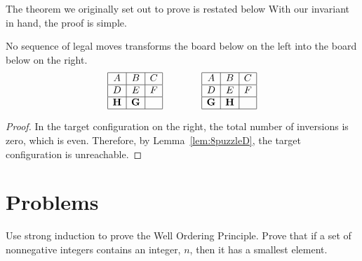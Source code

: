 The theorem we originally set out to prove is restated below  With our
invariant in hand, the proof is simple.
\begin{theorem*}
No sequence of legal moves transforms the board below on the left into
the board below on the right.
\begin{equation*}
\begin{array}{|c|c|c|}
\hline
A & B & C \\ \hline
D & E & F \\ \hline
\mathbf{H} & \mathbf{G} &   \\ \hline
\end{array}
\qquad\qquad
\begin{array}{|c|c|c|}
\hline
A & B & C \\ \hline
D & E & F \\ \hline
\mathbf{G} & \mathbf{H} &   \\ \hline
\end{array}
\end{equation*}
\end{theorem*}

\begin{proof}
In the target configuration on the right, the total number of
inversions is zero, which is even.  Therefore, by
Lemma~\ref{lem:8puzzleD}, the target configuration is unreachable.
\end{proof}

\section{Problems}

\begin{problems}
\practiceproblems

\classproblems


\homeworkproblems
{}


\begin{editingnotes}
\begin{problem}
Use strong induction to prove the Well Ordering Principle. \hint Prove
that if a set of nonnegative integers contains an integer, $n$, then it
has a smallest element.
\end{problem}
\end{editingnotes}

\end{problems}

\endinput
